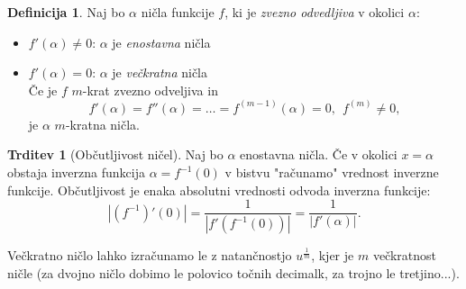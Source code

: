 \documentclass[11pt]{article}
\theoremstyle{definition}
\newtheorem{definicija}{Definicija}[section]
\newtheorem{trditev}{Trditev}
\begin{document}
\begin{definicija}

Naj bo $\alpha$ ničla funkcije $f$, ki je \textit{zvezno odvedljiva} v okolici $\alpha$:
\begin{itemize}

	\item $f'(\alpha) \neq 0$: $\alpha$ je \textit{enostavna} ničla
	
	\item $f'(\alpha) = 0$: $\alpha$ je \textit{večkratna} ničla \\
	
	Če je $f$ $m$-krat zvezno odveljiva in
	$$f'(\alpha) = f''(\alpha) = \ldots = f^{(m-1)}(\alpha) = 0,~~f^{(m)} \neq 0,$$
	je $\alpha$ $m$-kratna ničla.

\end{itemize}

\end{definicija}
\vspace{0.5cm}

\begin{trditev}[Občutljivost ničel]

Naj bo $\alpha$ enostavna ničla. Če v okolici $x = \alpha$ obstaja inverzna funkcija $\alpha = f^{-1}(0)$ v bistvu "računamo" vrednost inverzne funkcije. Občutljivost je enaka absolutni vrednosti odvoda inverzna funkcije:
$$|(f^{-1})'(0)| = \frac{1}{|f'(f^{-1}(0))|} = \frac{1}{|f'(\alpha)|}.$$

Večkratno ničlo lahko izračunamo le z natančnostjo $u^{\frac{1}{m}}$, kjer je $m$ večkratnost ničle (za dvojno ničlo dobimo le polovico točnih decimalk, za trojno le tretjino...). 

\end{trditev}
\vspace{0.5cm}
\end{document}
